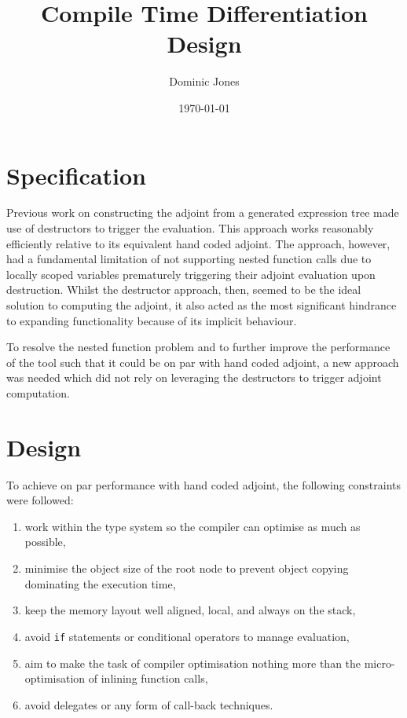 \documentclass[a4paper,10pt]{article}
\title{Compile Time Differentiation Design}
\author{Dominic Jones}
\date{\today}
\begin{document}
\maketitle

\section{Specification}
Previous work on constructing the adjoint from a generated expression tree made use of destructors to trigger the evaluation. This approach works reasonably efficiently relative to its equivalent hand coded adjoint. The approach, however, had a fundamental limitation of not supporting nested function calls due to locally scoped variables prematurely triggering their adjoint evaluation upon destruction. Whilst the destructor approach, then, seemed to be the ideal solution to computing the adjoint, it also acted as the most significant hindrance to expanding functionality because of its implicit behaviour.

To resolve the nested function problem and to further improve the performance of the tool such that it could be on par with hand coded adjoint, a new approach was needed which did not rely on leveraging the destructors to trigger adjoint computation.

\section{Design}
To achieve on par performance with hand coded adjoint, the following constraints were followed:
\begin{enumerate}
\item work within the type system so the compiler can optimise as much as possible,
\item minimise the object size of the root node to prevent object copying dominating the execution time,
\item keep the memory layout well aligned, local, and always on the stack,
\item avoid \texttt{if} statements or conditional operators to manage evaluation,
\item aim to make the task of compiler optimisation nothing more than the micro-optimisation of inlining function calls,
\item avoid delegates or any form of call-back techniques.
\end{enumerate}
\end{document}
